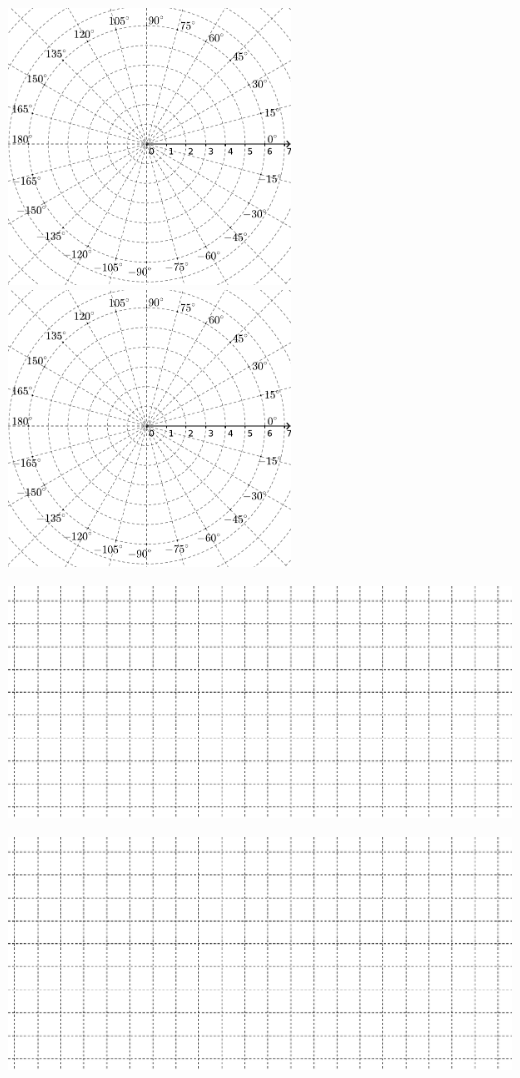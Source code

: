 \documentclass[12pt,a4paper]{article}
\begin{document}
\newpage
\restoregeometry
\begin{multicols}{2}
\includegraphics[width=7.5cm]{img/prova-4-pro-malha-1}
\vspace{2em}
\includegraphics[width=7.5cm]{img/prova-4-pro-malha-1}
\end{multicols}
\includegraphics[width=16cm]{img/prova-4-pro-malha-2}

\vspace{2em}
\includegraphics[width=16cm]{img/prova-4-pro-malha-2}

\end{document}
